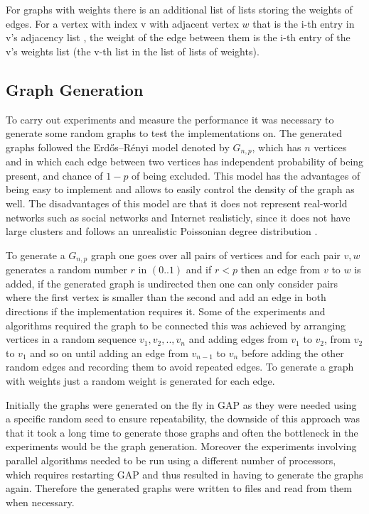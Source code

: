 \documentclass{report}
\theoremstyle{plain}
\theoremstyle{definition}
\theoremstyle{remark}
\begin{document}
For graphs with weights there is an additional list of lists storing the weights of edges. For a vertex with index v with adjacent vertex $w$ that is the i-th entry in v's adjacency list , the weight of the edge between them is the i-th entry of the v's weights list (the v-th list in the list of lists of weights).

\subsection{Graph Generation}

To carry out experiments and measure the performance it was necessary to generate some random graphs to test the implementations on. The generated graphs followed the Erdős–Rényi model denoted by $G_{n,p}$, which has $n$ vertices and in which each edge between two vertices has independent probability of being present, and chance of $1-p$ of being excluded. This model has the advantages of being easy to implement and allows to easily control the density of the graph as well. The disadvantages of this model are that it does not represent real-world networks such as social networks and Internet realisticly, since it does not have large clusters and follows an unrealistic Poissonian degree distribution \cite{newman20062}.

To generate a $G_{n,p}$ graph one goes over all pairs of vertices and for each pair $v,w$ generates a random number $r$ in $(0..1)$ and if $r < p$ then an edge from $v$ to $w$ is added, if the generated graph is undirected then one can only consider pairs where the first vertex is smaller than the second and add an edge in both directions if the implementation requires it. Some of the experiments and algorithms required the graph to be connected this was achieved by arranging vertices in a random sequence $v_1,v_2,..,v_n$ and adding edges from $v_1$ to $v_2$, from $v_2$ to $v_1$ and so on until adding an edge from $v_{n-1}$ to $v_n$  before adding the other random edges and recording them to avoid repeated edges. To generate a graph with weights just a random weight is generated for each edge.

Initially the graphs were generated on the fly in GAP as they were needed  using a specific random seed to ensure repeatability, the downside of this approach was that it took a long time to generate those graphs and often the bottleneck in the experiments would be the graph generation. Moreover the experiments involving parallel algorithms needed to be run using a different number of processors, which requires restarting GAP and thus resulted in having to generate the graphs again. Therefore the generated graphs were written to files and read from them when necessary.
\end{document}
